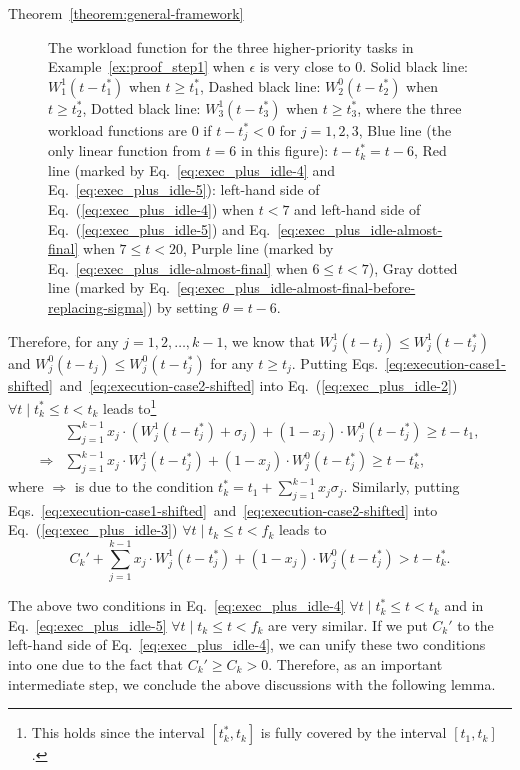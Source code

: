 \begin{appProof}{Theorem~\ref{theorem:general-framework}}
\begin{figure}[t]
\begin{tikzpicture}[x=\ux,y=\uy, font=\sffamily,thick]
		\end{tikzpicture}    
  \caption{\small The workload function for the three higher-priority tasks in Example~\ref{ex:proof_step1} when $\epsilon$ is very close to $0$. Solid black line: $W_1^1(t-t_1^*)$ when $t \geq t_1^*$, Dashed black line: $W_2^0(t-t_2^*)$ when $t \geq t_2^*$, Dotted black line: $W_3^1(t-t_3^*)$ when $t \geq t_3^*$, where the three workload functions are $0$ if $t-t_j^* < 0$ for $j=1,2,3$, Blue line (the only linear function from $t=6$ in this figure): $t-t_k^*=t-6$, Red line (marked by Eq.~\eqref{eq:exec_plus_idle-4} and Eq.~\eqref{eq:exec_plus_idle-5}): left-hand side of Eq.~(\ref{eq:exec_plus_idle-4}) when $t < 7$ and left-hand side of Eq.~(\ref{eq:exec_plus_idle-5}) and Eq.~\eqref{eq:exec_plus_idle-almost-final} when $ 7 \leq t < 20$, Purple line (marked by Eq.~\eqref{eq:exec_plus_idle-almost-final} when $6 \leq t < 7$), Gray dotted line (marked by Eq.~\eqref{eq:exec_plus_idle-almost-final-before-replacing-sigma}) by setting $\theta=t-6$.}
  \label{fig:example-proof-final}
\end{figure}


Therefore, for any $j=1,2,\ldots,k-1$, we know that $W_j^1(t-t_j)
\leq W_j^1(t-t_j^*)$ and $W_j^0(t-t_j) \leq W_j^0(t-t_j^*)$ for any $t
\geq t_j$. Putting Eqs.~\eqref{eq:execution-case1-shifted}~and~\eqref{eq:execution-case2-shifted} into 
Eq.~(\ref{eq:exec_plus_idle-2}) $\forall t \mid t_k^* \leq t < t_k$ leads to\footnote{This holds since the interval $[t_k^*, t_k]$ is fully covered by the interval $[t_1, t_k]$.}
{\small \begin{align}
&\sum_{j=1}^{k-1} x_j\cdot (W_j^1(t-t_j^*)+\sigma_j) + (1-x_j)\cdot W_j^0(t-t_j^*) \geq t-t_1,\nonumber\\
\Rightarrow& \sum_{j=1}^{k-1} x_j\cdot W_j^1(t-t_j^*) + (1-x_j)\cdot W_j^0(t-t_j^*) \geq t-t_k^*,
\label{eq:exec_plus_idle-4}
\end{align}}where $\Rightarrow$ is due to the condition
$t_k^* = t_1 + \sum_{j=1}^{k-1}x_j\sigma_j$.
Similarly, putting Eqs.~\eqref{eq:execution-case1-shifted}~and~\eqref{eq:execution-case2-shifted} into 
Eq.~(\ref{eq:exec_plus_idle-3}) $\forall t \mid t_k \leq t < f_k$ leads to 
\begin{equation}
\label{eq:exec_plus_idle-5}
C_k'+\sum_{j=1}^{k-1} x_j\cdot W_j^1(t-t_j^*) + (1-x_j)\cdot W_j^0(t-t_j^*) > t-t_k^*.
\end{equation}

The above two conditions in Eq.~\eqref{eq:exec_plus_idle-4} $\forall t \mid t_k^* \leq t < t_k$ and in Eq.~\eqref{eq:exec_plus_idle-5} $\forall t \mid t_k \leq t < f_k$ are very similar. If we put $C_k'$ to the left-hand side of Eq.~\eqref{eq:exec_plus_idle-4}, we can unify these two conditions into one due to the fact that $C_k' \geq C_k > 0$. Therefore, as an important intermediate step, we conclude the above discussions with the following lemma.


\end{appProof}
